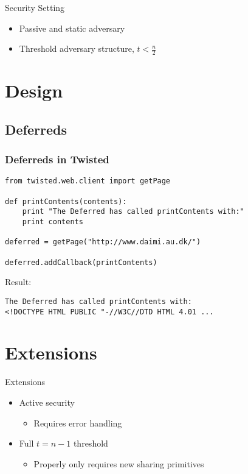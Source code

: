 \documentclass[t,noamsthm]{beamer}
\begin{document}
\begin{frame}{Security Setting}
  \begin{itemize}
  \item Passive and static adversary
  \item Threshold adversary structure, $t < \frac n 2$
  \end{itemize}
\end{frame}


\section{Design}

\subsection{Deferreds}

\begin{frame}[fragile]

\frametitle{Deferreds in Twisted}

\begin{lstlisting}
from twisted.web.client import getPage

def printContents(contents):
    print "The Deferred has called printContents with:"
    print contents

deferred = getPage("http://www.daimi.au.dk/")

deferred.addCallback(printContents)
\end{lstlisting}

Result:
\begin{lstlisting}[language={}]
The Deferred has called printContents with:
<!DOCTYPE HTML PUBLIC "-//W3C//DTD HTML 4.01 ...
\end{lstlisting}

\end{frame}


\section{Extensions}

\begin{frame}{Extensions}

  \begin{itemize}
  \item Active security
    \begin{itemize}
    \item Requires error handling
    \end{itemize}

  \item Full $t = n-1$ threshold
    \begin{itemize}
    \item Properly only requires new sharing primitives
    \end{itemize}
  \end{itemize}

\end{frame}
\end{document}
